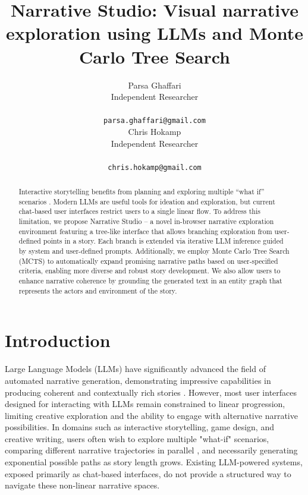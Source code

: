 \documentclass[11pt]{article}
\title{\textbf{Narrative Studio}: Visual narrative exploration using LLMs and Monte Carlo Tree Search}
\author{Parsa Ghaffari \\
  Independent Researcher \\ \\
  \texttt{parsa.ghaffari@gmail.com} \\\And
  Chris Hokamp \\
  Independent Researcher \\ \\
  \texttt{chris.hokamp@gmail.com} \\
}
\begin{document}
\maketitle

\begin{abstract}
Interactive storytelling benefits from planning and exploring multiple ``what if'' scenarios \citep{goldfarb-tarrant-etal-2020-content}. Modern LLMs are useful tools for ideation and exploration, but current chat-based user interfaces restrict users to a single linear flow. To address this limitation, we propose Narrative Studio -- a novel in-browser narrative exploration environment featuring a tree-like interface that allows branching exploration from user-defined points in a story. Each branch is extended via iterative LLM inference guided by system and user-defined prompts. Additionally, we employ Monte Carlo Tree Search (MCTS) to automatically expand promising narrative paths based on user-specified criteria, enabling more diverse and robust story development. We also allow users to enhance narrative coherence by grounding the generated text in an entity graph that represents the actors and environment of the story.
\end{abstract}

\section{Introduction}

Large Language Models (LLMs) have significantly advanced the field of automated narrative generation, demonstrating impressive capabilities in producing coherent and contextually rich stories \citep{tian2024largelanguagemodelscapable}. However, most user interfaces designed for interacting with LLMs remain constrained to linear progression, limiting creative exploration and the ability to engage with alternative narrative possibilities. In domains such as interactive storytelling, game design, and creative writing, users often wish to explore multiple "what-if" scenarios, comparing different narrative trajectories in parallel \citep{10.1145/1536513.1536579}, and necessarily generating exponential possible paths as story length grows. Existing LLM-powered systems, exposed primarily as chat-based interfaces, do not provide a structured way to navigate these non-linear narrative spaces.
\end{document}
